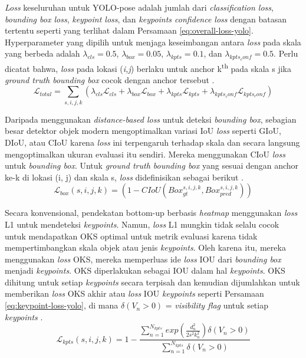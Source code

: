 \textit{Loss} keseluruhan untuk YOLO-pose adalah jumlah dari \textit{classification loss}, \textit{bounding box loss}, \textit{keypoint loss}, dan \textit{keypoints confidence loss} dengan batasan tertentu seperti yang terlihat dalam Persamaan \ref{eq:overall-loss-yolo}.
Hyperparameter yang dipilih untuk menjaga keseimbangan antara \textit{loss} pada skala yang berbeda adalah $\lambda_{cls} = 0.5$, $\lambda_{box} = 0.05$, $\lambda_{kpts} = 0.1$, dan $\lambda_{kpts_conf} = 0.5$.
Perlu dicatat bahwa, \textit{loss} pada lokasi (\emph{i,j}) berlaku untuk anchor k\textsuperscript{th} pada skala s jika \textit{ground truth bounding box} cocok dengan anchor tersebut \parencite{maji2022yolopose}.
\begin{equation}
  \label{eq:overall-loss-yolo}
  \mathcal{L}_{total} = \sum_{s,i,j,k} (\lambda_{cls}\mathcal{L}_{cls} + \lambda_{box}\mathcal{L}_{box} + \lambda_{kpts}\mathcal{L}_{kpts} + \lambda_{kpts_conf}\mathcal{L}_{kpts_conf})
\end{equation}

Daripada menggunakan \textit{distance-based loss} untuk deteksi \textit{bounding box}, sebagian besar detektor objek modern mengoptimalkan variasi IoU \textit{loss} seperti GIoU, DIoU, atau CIoU karena \textit{loss} ini terpengaruh terhadap skala dan secara langsung mengoptimalkan ukuran evaluasi itu sendiri.
Mereka menggunakan CIoU \textit{loss} untuk \textit{bounding box}. Untuk \textit{ground truth bounding box} yang sesuai dengan anchor ke-k di lokasi (i, j) dan skala s, \textit{loss} didefinisikan sebagai berikut \parencite{maji2022yolopose}.
\begin{equation}
  \label{eq:bbox-loss-yolo}
  \mathcal{L}_{box}(s,i,j,k) = (1 - CIoU(Box_{gt}^{s,i,j,k}, Box_{pred}^{s,i,j,k}))
\end{equation}

Secara konvensional, pendekatan bottom-up berbasis \textit{heatmap} menggunakan \textit{loss} L1 untuk mendeteksi \textit{keypoints}. Namun, \textit{loss} L1 mungkin tidak selalu cocok untuk mendapatkan OKS optimal untuk metrik evaluasi karena tidak mempertimbangkan skala objek atau jenis \textit{keypoints}.
Oleh karena itu, mereka menggunakan \textit{loss} OKS, mereka memperluas ide \textit{loss} IOU dari \textit{bounding box} menjadi \textit{keypoints}. OKS diperlakukan sebagai IOU dalam hal \textit{keypoints}. OKS dihitung untuk setiap \textit{keypoints} secara terpisah dan kemudian dijumlahkan untuk memberikan \textit{loss} OKS akhir
atau \textit{loss} IOU \textit{keypoints} seperti Persamaan \ref{eq:keypoint-loss-yolo}, di mana $\delta(V_n > 0)$ = \textit{visibility flag} untuk setiap \textit{keypoints} \parencite{maji2022yolopose}.
\begin{equation}
  \label{eq:keypoint-loss-yolo}
  \mathcal{L}_{kpts}(s,i,j,k) = 1 - \frac{\sum_{n=1}^{N_{kpts}} exp\left( \frac{d_n^2}{2s^2k_n^2} \right) \delta(V_n > 0) }{\sum_{n=1}^{N_{kpts}} \delta(V_n > 0)}
\end{equation}

